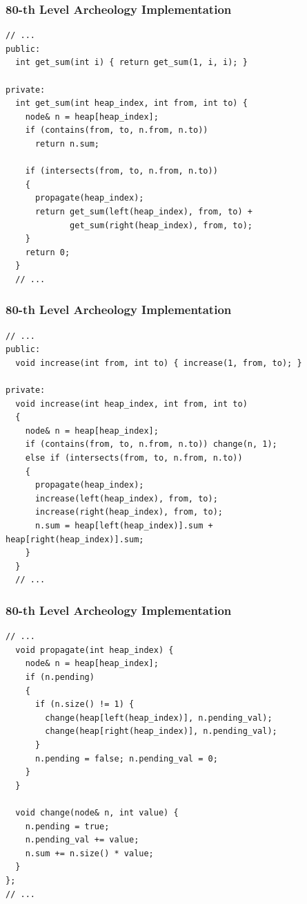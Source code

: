 \documentclass{beamer}
\begin{document}
\begin{frame}[containsverbatim]
\frametitle{80-th Level Archeology Implementation}

\scriptsize

\begin{lstlisting}[mathescape]
  // ...
public:
  int get_sum(int i) { return get_sum(1, i, i); }

private:
  int get_sum(int heap_index, int from, int to) {
    node& n = heap[heap_index];
    if (contains(from, to, n.from, n.to))
      return n.sum;

    if (intersects(from, to, n.from, n.to))
    {
      propagate(heap_index);
      return get_sum(left(heap_index), from, to) +
             get_sum(right(heap_index), from, to);
    }
    return 0;
  }
  // ...
\end{lstlisting}

\end{frame}

\begin{frame}[containsverbatim]
\frametitle{80-th Level Archeology Implementation}

\scriptsize

\begin{lstlisting}[mathescape]
  // ...
public:
  void increase(int from, int to) { increase(1, from, to); }

private:
  void increase(int heap_index, int from, int to)
  {
    node& n = heap[heap_index];
    if (contains(from, to, n.from, n.to)) change(n, 1);
    else if (intersects(from, to, n.from, n.to))
    {
      propagate(heap_index);
      increase(left(heap_index), from, to);
      increase(right(heap_index), from, to);
      n.sum = heap[left(heap_index)].sum + heap[right(heap_index)].sum;
    }
  }
  // ...
\end{lstlisting}

\end{frame}

\begin{frame}[containsverbatim]
\frametitle{80-th Level Archeology Implementation}

\scriptsize

\begin{lstlisting}[mathescape]
  // ...
  void propagate(int heap_index) {
    node& n = heap[heap_index];
    if (n.pending)
    {
      if (n.size() != 1) {
        change(heap[left(heap_index)], n.pending_val);
        change(heap[right(heap_index)], n.pending_val);
      }
      n.pending = false; n.pending_val = 0;
    }
  }

  void change(node& n, int value) {
    n.pending = true;
    n.pending_val += value;
    n.sum += n.size() * value;
  }
};
// ...
\end{lstlisting}

\end{frame}
\end{document}

